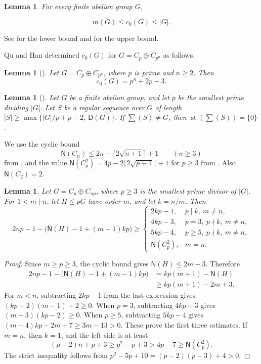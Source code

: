 \documentclass[10pt,reqno]{amsart}
\newtheorem{lem}[thm]{Lemma}
\theoremstyle{definition}
\theoremstyle{remark}
\numberwithin{equation}{section}
\DeclareMathOperator{\st}{st}
\begin{document}
\begin{lem}\label{lem2.3}
	For every finite abelian group $G$,  
	
	$$m(G) \le c_0(G)\le |G|.$$
\end{lem}

See \cite[Lemma~2.3]{[GQZ2020]} for the lower bound and
\cite[Lemma~2.4]{[GHQQZ2015]} for the upper bound.

Qu and Han determined $c_0(G)$ for $G=C_p\oplus C_{p^n}$ as follows.

\begin{lem}[\cite{[QH2017]}]\label{lem2.4}
	Let $G=C_p\oplus C_{p^n}$, where $p$ is prime and $n\ge2$. Then
	$$c_0(G)=p^n+2p-3.$$
\end{lem}

\begin{lem}[{\cite[Lemma~2.3(1)]{[GHQQZ2015]}}]\label{lem5.2}
	Let $G$ be a finite abelian group, and let $p$ be the smallest prime dividing $|G|$. Let $S$ be a regular sequence over $G$ of length $|S|\ge \max \{|G|/p+p-2,~ \mathsf D(G)\}$. If $\sum (S)\ne G$, then $\st(\sum (S)) = \{0\}$.
\end{lem}

We use the cyclic bound
\[
\mathsf N(C_n)\le 2n-\lceil2\sqrt{n+1}\rceil+1\qquad(n\ge3)
\]
from \cite[Theorem~1.1]{[JY2024]}, and the value
$\mathsf N(C_p^2)=4p-2\lceil2\sqrt{p+1}\rceil+1$ for $p\ge3$
from \cite[Theorem~1.3(3)]{[GHHLYZ2022-2]}.
Also $\mathsf N(C_2)=2$.

\begin{lem}\label{lem2.7}
Let $G=C_p\oplus C_{np}$, where $p\ge3$ is the smallest prime divisor
of $|G|$. For $1<m\mid n$, let $H\le pG$ have order $m$, and let $k=n/m$.
Then
\[
2np-1-\bigl(\mathsf{N}(H)-1+(m-1)kp\bigr)\ge
\begin{cases}
2kp-1,&p\mid k,\ m\ne n,\\
4kp-3,&p=3,\ p\nmid k,\ m\ne n,\\
5kp-4,&p\ge5,\ p\nmid k,\ m\ne n,\\
\mathsf{N}(C_p^2),&m=n.
\end{cases}
\]
\end{lem}
\begin{proof}
Since $m\ge p\ge3$, the cyclic bound gives $\mathsf N(H)\le2m-3$.
Therefore
\[
\begin{aligned}
2np-1-\bigl(\mathsf N(H)-1+(m-1)kp\bigr)
&=kp(m+1)-\mathsf N(H)\\
&\ge kp(m+1)-2m+3.
\end{aligned}
\]
For $m<n$, subtracting $2kp-1$ from the last expression gives
$(kp-2)(m-1)+2\ge0$.
When $p=3$, subtracting $4kp-3$ gives $(m-3)(kp-2)\ge0$.
When $p\ge5$, subtracting $5kp-4$ gives
$(m-4)kp-2m+7\ge3m-13>0$.
These prove the first three estimates.
If $m=n$, then $k=1$, and the left side is at least
\[
(p-2)n+p+3\ge p^2-p+3>4p-7\ge\mathsf N(C_p^2).
\]
The strict inequality follows from
$p^2-5p+10=(p-2)(p-3)+4>0$.
\end{proof}
\end{document}
